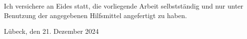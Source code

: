 \thispagestyle{plain}

\vspace*{7cm}
\noindent Ich versichere an Eides statt, die vorliegende Arbeit selbstständig und nur unter Benutzung der angegebenen Hilfsmittel angefertigt zu haben.

\vspace*{3cm}
\noindent Lübeck, den 21. Dezember 2024
\newpage
